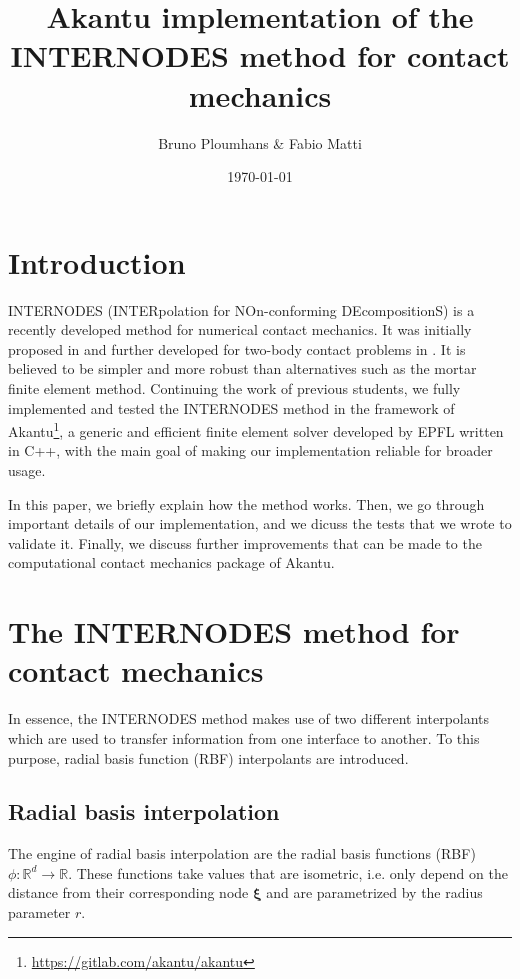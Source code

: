 \documentclass[11pt, a4paper]{article}
\title{Akantu implementation of the INTERNODES method for contact mechanics}
\author{Bruno Ploumhans \& Fabio Matti}
\date{\today}
\begin{document}
\maketitle

\tableofcontents

\clearpage
\section{Introduction}
\label{sec:intro}
INTERNODES (INTERpolation for NOn-conforming DEcompositionS) is a recently developed method for numerical contact mechanics. It was initially proposed in \cite{deparis} and further developed for two-body contact problems in \cite{voet}. It is believed to be simpler and more robust than alternatives such as the mortar finite element method. Continuing the work of previous students, we fully implemented and tested the INTERNODES method in the framework of Akantu\footnote{\url{https://gitlab.com/akantu/akantu}}, a generic and efficient finite element solver developed by EPFL written in C++, with the main goal of making our implementation reliable for broader usage.

In this paper, we briefly explain how the method works. Then, we go through important details of our implementation, and we dicuss the tests that we wrote to validate it. Finally, we discuss further improvements that can be made to the computational contact mechanics package of Akantu.

\clearpage
\section{The INTERNODES method for contact mechanics}
\label{sec:internodes}

In essence, the INTERNODES method makes use of two different interpolants which are used to transfer information from one interface to another. To this purpose, radial basis function (RBF) interpolants are introduced.

\subsection{Radial basis interpolation}
\label{subsec:rbf-interpolation}

The engine of radial basis interpolation are the radial basis functions (RBF) $\phi: \mathbb{R}^d \to \mathbb{R}$. These functions take values that are isometric, i.e. only depend on the distance from their corresponding node $\boldsymbol{\xi}$ and are parametrized by the radius parameter $r$.
\end{document}

